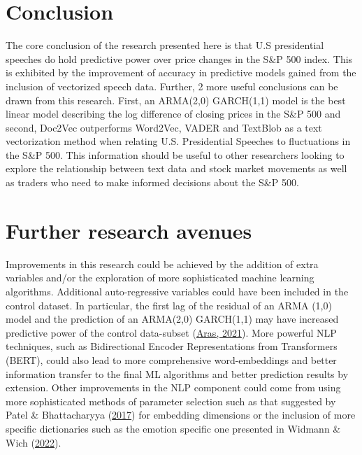 \documentclass[11pt,preprint, authoryear]{elsarticle}
\numberwithin{equation}{section}
\numberwithin{figure}{section}
\numberwithin{table}{section}
\begin{document}
\hypertarget{conclusion}{%
\section{Conclusion}\label{conclusion}}

The core conclusion of the research presented here is that U.S
presidential speeches do hold predictive power over price changes in the
S\&P 500 index. This is exhibited by the improvement of accuracy in
predictive models gained from the inclusion of vectorized speech data.
Further, 2 more useful conclusions can be drawn from this research.
First, an ARMA(2,0) GARCH(1,1) model is the best linear model describing
the log difference of closing prices in the S\&P 500 and second, Doc2Vec
outperforms Word2Vec, VADER and TextBlob as a text vectorization method
when relating U.S. Presidential Speeches to fluctuations in the S\&P
500. This information should be useful to other researchers looking to
explore the relationship between text data and stock market movements as
well as traders who need to make informed decisions about the S\&P 500.

\hypertarget{further-research-avenues}{%
\section{Further research avenues}\label{further-research-avenues}}

Improvements in this research could be achieved by the addition of extra
variables and/or the exploration of more sophisticated machine learning
algorithms. Additional auto-regressive variables could have been
included in the control dataset. In particular, the first lag of the
residual of an ARMA (1,0) model and the prediction of an ARMA(2,0)
GARCH(1,1) may have increased predictive power of the control
data-subset (\protect\hyperlink{ref-aras2021stacking}{Aras, 2021}). More
powerful NLP techniques, such as Bidirectional Encoder Representations
from Transformers (BERT), could also lead to more comprehensive
word-embeddings and better information transfer to the final ML
algorithms and better prediction results by extension. Other
improvements in the NLP component could come from using more
sophisticated methods of parameter selection such as that suggested by
Patel \& Bhattacharyya
(\protect\hyperlink{ref-patel-bhattacharyya-2017-towards}{2017}) for
embedding dimensions or the inclusion of more specific dictionaries such
as the emotion specific one presented in Widmann \& Wich
(\protect\hyperlink{ref-widmann_wich_2022}{2022}).
\end{document}

